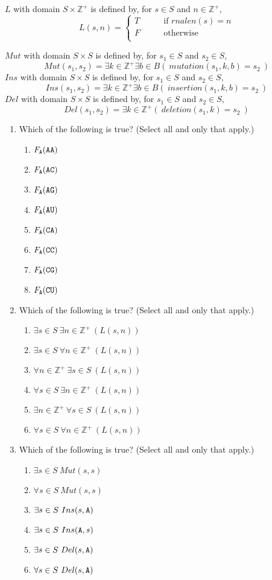$L$ with domain $S \times \mathbb{Z}^+$ is defined by, for $s \in S$ and $n \in \mathbb{Z}^+$,
\[
L( s, n) = \begin{cases}
T &\qquad\text{if $rnalen(s) = n$}\\
F &\qquad\text{otherwise}\\
\end{cases}
\]

$Mut$ with domain $S \times S$ is defined by, for $s_1 \in S$ and $s_2 \in S$,
\[
Mut(s_1,s_2) = \exists k\in \mathbb{Z^+} \exists b \in B (~ mutation(s_1, k, b) = s_2~)
\]
$Ins$ with domain $S \times S$ is defined by, for $s_1 \in S$ and $s_2 \in S$,
\[
Ins(s_1,s_2) = \exists k\in \mathbb{Z^+} \exists b \in B (~ insertion(s_1, k, b) = s_2~)
\]
$Del$ with domain $S \times S$ is defined by, for $s_1 \in S$ and $s_2 \in S$,
\[
Del(s_1,s_2) = \exists k\in \mathbb{Z^+} (~ deletion(s_1, k) = s_2~)
\]

\begin{enumerate}
\item Which of the following is true? (Select  all and only that apply.)
 \begin{enumerate}
    \item $F_{\texttt{A}} ( \texttt{A}\texttt{A})$
    \item $F_{\texttt{A}} ( \texttt{A}\texttt{C})$
    \item $F_{\texttt{A}} ( \texttt{A}\texttt{G})$
    \item $F_{\texttt{A}} ( \texttt{A}\texttt{U})$
    \item $F_{\texttt{A}} ( \texttt{C}\texttt{A})$
    \item $F_{\texttt{A}} ( \texttt{C}\texttt{C})$
    \item $F_{\texttt{A}} ( \texttt{C}\texttt{G})$
    \item $F_{\texttt{A}} ( \texttt{C}\texttt{U})$
 \end{enumerate}    
\item Which of the following is true? (Select  all and only that apply.)
 \begin{enumerate}
    \item $\exists s \in S ~\exists n \in \mathbb{Z}^+ ~(L(s,n))$
    \item $\exists s \in S ~\forall n \in \mathbb{Z}^+ ~(L(s,n))$
    \item $\forall n \in \mathbb{Z}^+~\exists s \in S ~(L(s,n))$
    \item $\forall s \in S ~\exists n \in \mathbb{Z}^+ ~(L(s,n))$
    \item $\exists n \in \mathbb{Z}^+ ~\forall s \in S ~(L(s,n))$
    \item $\forall s \in S ~\forall n \in \mathbb{Z}^+ ~(L(s,n))$
 \end{enumerate} 
\item Which of the following is true? (Select  all and only that apply.)
 \begin{enumerate}
    \item $\exists s \in S ~Mut(s,s)$
    \item $\forall s \in S ~Mut(s,s)$
    \item $\exists s \in S ~Ins(s,\texttt{A})$
    \item $\exists s \in S ~Ins(\texttt{A},s)$
    \item $\exists s \in S ~Del(s,\texttt{A})$
    \item $\forall s \in S ~Del(s,\texttt{A})$
 \end{enumerate} 
\end{enumerate}
